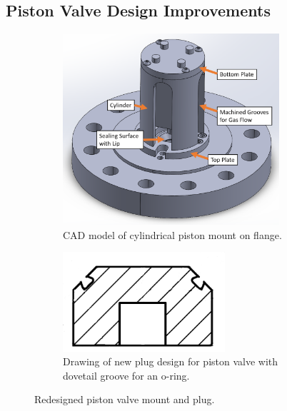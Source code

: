 \subsection{Piston Valve Design Improvements} \label{ss:new valve}

\begin{figure}[tb]
    \vspace{16pt}
    \centering
    \begin{subfigure}[t]{0.45\textwidth}
        \centering
        \includegraphics[width=0.88\textwidth]{design/photos/piston_mount_gen2_cad_labels.png}
        \caption{CAD model of cylindrical piston mount on flange.}
        \label{fig:cad mount 2}
    \end{subfigure}
    \hfill
    \begin{subfigure}[t]{0.45\textwidth}
        \centering
        \includegraphics[width=0.66\textwidth]{design/photos/new_plug_draw_crop_paint.png}
        \caption{Drawing of new plug design for piston valve with dovetail groove for an o-ring.}
        \label{fig:plug v2 draw}
    \end{subfigure}
    
    \caption{Redesigned piston valve mount and plug.}
    \label{fig:redesign}
    \vspace{16pt}
\end{figure}

